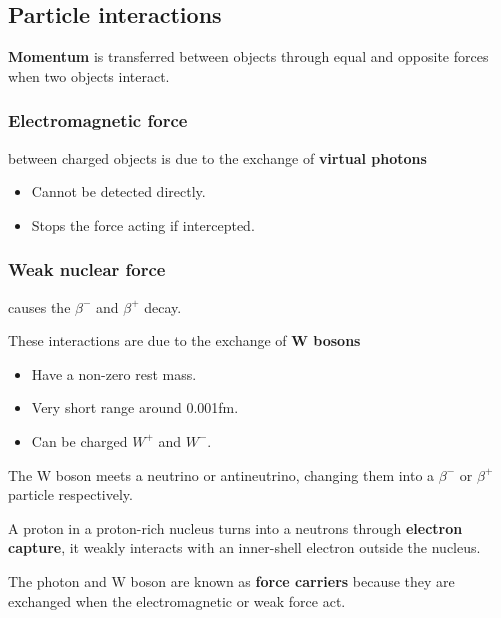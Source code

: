 \subsection{Particle interactions}

\textbf{Momentum} is transferred between objects through equal and opposite forces when two objects interact.

\subsubsection*{Electromagnetic force}
between charged objects is due to the exchange of \textbf{virtual photons}
\begin{itemize}
    \item Cannot be detected directly.
    \item Stops the force acting if intercepted.
\end{itemize}

\subsubsection*{Weak nuclear force}
causes the $\beta^-$ and $\beta^+$ decay.

These interactions are due to the exchange of \textbf{W bosons}
\begin{itemize}
    \item Have a non-zero rest mass.
    \item Very short range around 0.001fm.
    \item Can be charged $W^+$ and $W^-$.
\end{itemize}

The W boson meets a neutrino or antineutrino, changing them into a $\beta^-$ or $\beta^+$ particle respectively.

A proton in a proton-rich nucleus turns into a neutrons through \textbf{electron capture}, it weakly interacts with an inner-shell electron outside the nucleus.

The photon and W boson are known as \textbf{force carriers} because they are exchanged when the electromagnetic or weak force act.
